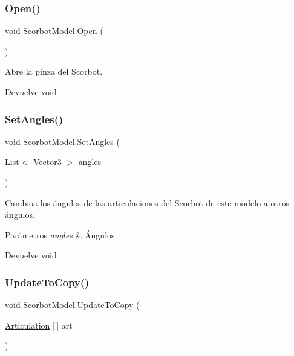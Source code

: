 \subsubsection{\texorpdfstring{Open()}{Open()}}
{\footnotesize\ttfamily void Scorbot\+Model.\+Open (\begin{DoxyParamCaption}{ }\end{DoxyParamCaption})\hspace{0.3cm}{\ttfamily [inline]}}

Abre la pinza del Scorbot. \begin{DoxyReturn}{Devuelve}
void 
\end{DoxyReturn}
\mbox{\label{class_scorbot_model_a74549ede37f30edafb1dbf07c0730cdd}} 
\subsubsection{\texorpdfstring{SetAngles()}{SetAngles()}}
{\footnotesize\ttfamily void Scorbot\+Model.\+Set\+Angles (\begin{DoxyParamCaption}\item[{List$<$ Vector3 $>$}]{angles }\end{DoxyParamCaption})\hspace{0.3cm}{\ttfamily [inline]}}

Cambioa los ángulos de las articulaciones del Scorbot de este modelo a otros ángulos. 
\begin{DoxyParams}{Parámetros}
{\em angles} & Ángulos \\
\hline
\end{DoxyParams}
\begin{DoxyReturn}{Devuelve}
void 
\end{DoxyReturn}
\mbox{\label{class_scorbot_model_a78e73b1e1b2cda29a55529326ba2ca90}} 
\subsubsection{\texorpdfstring{UpdateToCopy()}{UpdateToCopy()}}
{\footnotesize\ttfamily void Scorbot\+Model.\+Update\+To\+Copy (\begin{DoxyParamCaption}\item[{\mbox{\hyperlink{class_articulation}{Articulation}} \mbox{[}$\,$\mbox{]}}]{art }\end{DoxyParamCaption})\hspace{0.3cm}{\ttfamily [inline]}}

